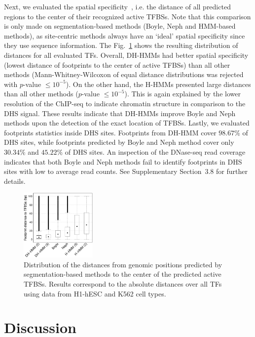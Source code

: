 \documentclass{bioinfo}
\begin{document}
Next, we evaluated the spatial specificity~\citep{wilbanks2010}, i.e. the distance
of all predicted regions to the center of their recognized active TFBSs. Note that
this comparison is only made on segmentation-based methods (Boyle, Neph and HMM-based
methods), as site-centric methods always have an `ideal' spatial specificity
since they use sequence information. The Fig.~\ref{fig:boxplot} shows the resulting
distribution of distances for all evaluated TFs. Overall, DH-HMMs had better spatial
specificity (lowest distance of footprints to the center of active TFBSs) than all
other methods (Mann-Whitney-Wilcoxon of equal distance distributions was rejected
with $p$-value $\leq 10^{-5}$). On the other hand, the H-HMMs presented large distances
than all other methods ($p$-value $\leq 10^{-5}$). This is again explained by the lower
resolution of the ChIP-seq to indicate chromatin structure in comparison to the DHS
signal. These results indicate that DH-HMMs improve Boyle and Neph methods upon the
detection of the exact location of TFBSs. {\color{red} Lastly, we evaluated footprints statistics inside DHS sites. Footprints from DH-HMM cover $98.67\%$ of DHS sites, while footprints predicted by Boyle and Neph method cover only $30.34\%$ and $45.22\%$ of DHS sites. An inspection of the DNase-seq read coverage indicates that both Boyle and Neph methods fail to identify footprints in DHS sites with low to average read counts. See Supplementary Section~3.8 for further details.}

\begin{figure}[t]
\centering
     \includegraphics[width=0.33\textwidth]{Boxplot.eps}
\caption{Distribution of the distances from genomic positions predicted by segmentation-based methods to the center of the predicted active TFBSs. Results correspond to the absolute distances over all TFs using data from H1-hESC and K562 cell types.}
\label{fig:boxplot}
\end{figure}

\section{Discussion}
\label{sec:discussion}
\end{document}

